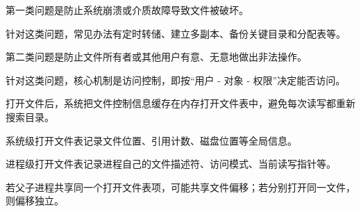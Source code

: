 \begin{points}
  \item 第一类问题是防止系统崩溃或介质故障导致文件被破坏。
  \item 针对这类问题，常见办法有定时转储、建立多副本、备份关键目录和分配表等。
  \item 第二类问题是防止文件所有者或其他用户有意、无意地做出非法操作。
  \item 针对这类问题，核心机制是访问控制，即按“用户 - 对象 - 权限”决定能否访问。
\end{points}


\begin{points}
  \item 打开文件后，系统把文件控制信息缓存在内存打开文件表中，避免每次读写都重新搜索目录。
  \item 系统级打开文件表记录文件位置、引用计数、磁盘位置等全局信息。
  \item 进程级打开文件表记录进程自己的文件描述符、访问模式、当前读写指针等。
  \item 若父子进程共享同一个打开文件表项，可能共享文件偏移；若分别打开同一文件，则偏移独立。
\end{points}
